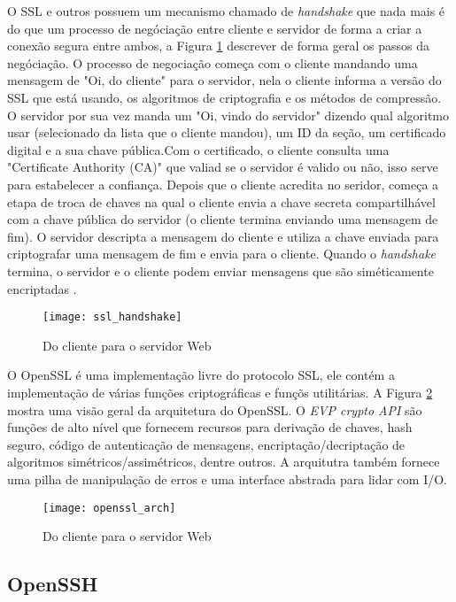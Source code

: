 O SSL e outros possuem um mecanismo chamado de \textit{handshake} que nada mais é do que um processo de negóciação entre cliente e servidor de forma a criar a conexão segura entre ambos, a Figura \ref{fig:openssl_handshake} descrever de forma geral os passos da negóciação. O processo de negociação começa com o cliente mandando uma mensagem de "Oi, do cliente" para o servidor, nela o cliente informa a versão do SSL que está usando, os algoritmos de criptografia e os métodos de compressão. O servidor por sua vez manda um "Oi, vindo do servidor" dizendo qual algoritmo usar (selecionado da lista que o cliente mandou), um ID da seção, um certificado digital e a sua chave pública.Com o certificado, o cliente consulta uma "Certificate Authority (CA)" que valiad se o servidor é valido ou não, isso serve para estabelecer a confiança. Depois que o cliente acredita no seridor, começa a etapa de troca de chaves na qual o cliente envia a chave secreta compartilhável com a chave pública do servidor (o cliente termina enviando uma mensagem de fim). O servidor descripta a mensagem do cliente e utiliza a chave enviada para criptografar uma mensagem de fim e envia para o cliente. Quando o \textit{handshake} termina, o servidor e o cliente podem enviar mensagens que são siméticamente encriptadas \citep{openssl}.

\begin{figure}[!h]
  \centering
  \texttt{[image: ssl\_handshake]}
  \caption{Do cliente para o servidor Web}
  \label{fig:openssl_handshake}
\end{figure}

O OpenSSL é uma implementação livre do protocolo SSL, ele contém a implementação de várias funções criptográficas e funçõs utilitárias. A Figura \ref{fig:openssl_arch} mostra uma visão geral da arquitetura do OpenSSL. O \textit{EVP crypto API} são funções de alto nível que fornecem recursos para derivação de chaves, hash seguro, código de autenticação de mensagens, encriptação/decriptação de algoritmos simétricos/assimétricos, dentre outros. A arquitutra também fornece uma pilha de manipulação de erros e uma interface abstrada para lidar com I/O.


\begin{figure}[!h]
  \centering
  \texttt{[image: openssl\_arch]}
  \caption{Do cliente para o servidor Web \citep{crypto_openssl}}
  \label{fig:openssl_arch}
\end{figure}


\subsection{OpenSSH}

